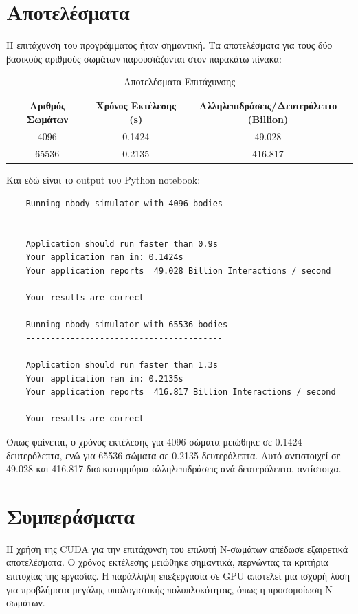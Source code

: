 \documentclass{article}
\begin{document}
\section{Αποτελέσματα}
Η επιτάχυνση του προγράμματος ήταν σημαντική. Τα αποτελέσματα για τους δύο βασικούς αριθμούς σωμάτων παρουσιάζονται στον παρακάτω πίνακα:

\begin{table}[h]
\centering
\begin{tabular}{|c|c|c|}
\hline
\textbf{Αριθμός Σωμάτων} & \textbf{Χρόνος Εκτέλεσης (s)} & \textbf{Αλληλεπιδράσεις/Δευτερόλεπτο (Billion)} \\
\hline
4096 & 0.1424 & 49.028 \\
65536 & 0.2135 & 416.817 \\
\hline
\end{tabular}
\caption{Αποτελέσματα Επιτάχυνσης}
\end{table}

Και εδώ είναι το output του Python notebook:
\begin{verbatim}
    Running nbody simulator with 4096 bodies
    ----------------------------------------
    
    Application should run faster than 0.9s
    Your application ran in: 0.1424s
    Your application reports  49.028 Billion Interactions / second
    
    Your results are correct
    
    Running nbody simulator with 65536 bodies
    ----------------------------------------
    
    Application should run faster than 1.3s
    Your application ran in: 0.2135s
    Your application reports  416.817 Billion Interactions / second
    
    Your results are correct
\end{verbatim}
Όπως φαίνεται, ο χρόνος εκτέλεσης για 4096 σώματα μειώθηκε σε 0.1424 δευτερόλεπτα, ενώ για 65536 σώματα σε 0.2135 δευτερόλεπτα. Αυτό αντιστοιχεί σε 49.028 και 416.817 δισεκατομμύρια αλληλεπιδράσεις ανά δευτερόλεπτο, αντίστοιχα.

\section{Συμπεράσματα}
Η χρήση της CUDA για την επιτάχυνση του επιλυτή Ν-σωμάτων απέδωσε εξαιρετικά αποτελέσματα. Ο χρόνος εκτέλεσης μειώθηκε σημαντικά, περνώντας τα κριτήρια επιτυχίας της εργασίας. Η παράλληλη επεξεργασία σε GPU αποτελεί μια ισχυρή λύση για προβλήματα μεγάλης υπολογιστικής πολυπλοκότητας, όπως η προσομοίωση Ν-σωμάτων.
\end{document}

